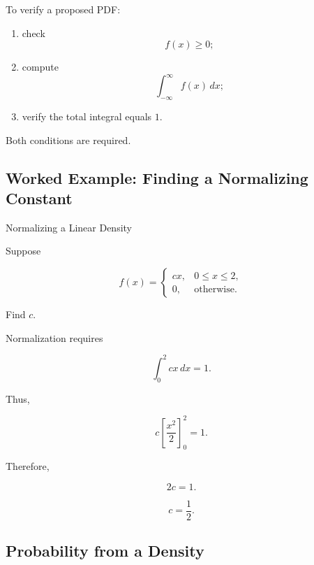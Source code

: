 To verify a proposed PDF:

\begin{enumerate}
    \item check
    \[
    f(x)\geq0;
    \]

    \item compute
    \[
    \int_{-\infty}^{\infty}f(x)\,dx;
    \]

    \item verify the total integral equals \(1\).
\end{enumerate}

Both conditions are required.

\subsection{Worked Example: Finding a Normalizing Constant}
\label{subsec:worked-density-normalization}

\begin{workedexamplebox}{Normalizing a Linear Density}

Suppose

\[
f(x)
=
\begin{cases}
cx,&0\leq x\leq2,\\
0,&\text{otherwise}.
\end{cases}
\]

Find \(c\).

Normalization requires

\[
\int_0^2 cx\,dx=1.
\]

Thus,

\[
c
\left[
\frac{x^2}{2}
\right]_0^2
=
1.
\]

Therefore,

\[
2c=1.
\]

\begin{answerbox}
\[
\boxed{
c=\frac12.
}
\]
\end{answerbox}

\end{workedexamplebox}

\subsection{Probability from a Density}
\label{subsec:probability-from-density}

